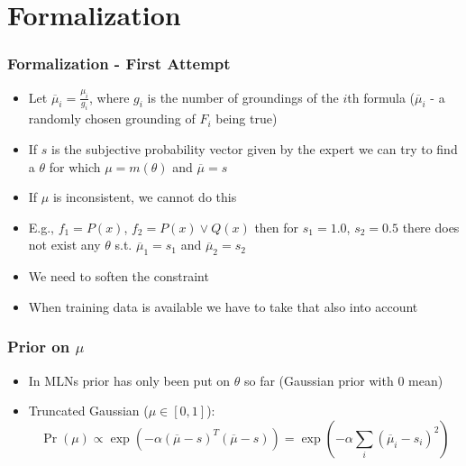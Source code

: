 \documentclass{beamer}
\begin{document}
\section{Formalization}
\frame
{
  \frametitle{Formalization - First Attempt}

  \begin{itemize}
    \item Let $\overline{\mu}_{i}= \frac{\mu_{i}}{g_{i}}$, where $g_{i}$ is the number of groundings of the $i$th formula
          ($\overline{\mu}_{i}$ - a randomly chosen grounding of $F_{i}$ being true)
    \item If $s$ is the subjective probability vector given by the expert we can try to find a $\theta$ 
          for which $\mu=m(\theta)$ and $\overline{\mu}=s$ 
    \item If $\mu$ is inconsistent, we cannot do this
    \item E.g., $f_1 = P(x)$, $f_2 = P(x) \lor Q(x)$ then for $s_1=1.0$, $s_2=0.5$ 
          there does not exist any $\theta$ s.t. $\overline{\mu}_{1}=s_1$ and 
          $\overline{\mu}_{2}=s_2$
    \item We need to soften the constraint
    \item When training data is available we have to take that also into account
  \end{itemize}
}

\frame
{
  \frametitle{Prior on $\mu$}

  \begin{itemize}
    \item In MLNs prior has only been put on $\theta$ so far (Gaussian prior with $0$ mean)
    \item Truncated Gaussian ($\mu \in [0,1]$):
	 \begin{equation*}
	  \Pr(\mu) \propto 
		  \exp \left(
		   - \alpha (\overline{\mu} - s)^{T} (\overline{\mu} - s)
		   \right)=
		 \exp \left(- \alpha \sum_{i} (\overline{\mu}_{i}- s_{i})^{2} \right)
	\end{equation*}
	\end{itemize}
}
 
\end{document}
